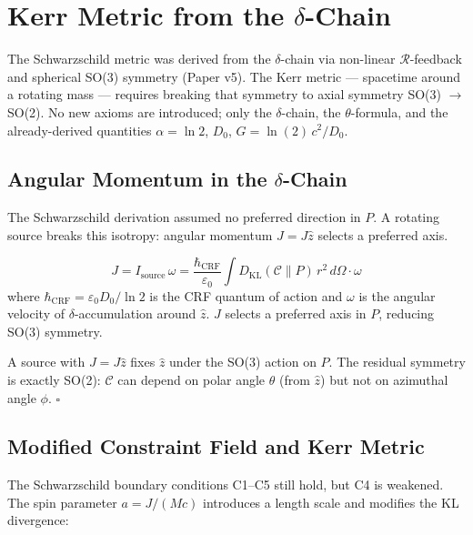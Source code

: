 \documentclass[12pt, a4paper]{article}
\begin{document}
\section{Kerr Metric from the $\delta$-Chain}

The Schwarzschild metric was derived from the $\delta$-chain via non-linear
$\mathcal{R}$-feedback and spherical SO(3) symmetry (Paper v5). The Kerr metric
--- spacetime around a rotating mass --- requires breaking that symmetry to axial
symmetry SO(3) $\to$ SO(2). No new axioms are introduced; only the $\delta$-chain,
the $\theta$-formula, and the already-derived quantities $\alpha = \ln 2$, $D_0$,
$G = \ln(2)\,c^2/D_0$.

\subsection{Angular Momentum in the $\delta$-Chain}

The Schwarzschild derivation assumed no preferred direction in $P$. A rotating source
breaks this isotropy: angular momentum $J = J\hat{z}$ selects a preferred axis.

\begin{formalbox}[title={Angular Momentum in CRF}]
\[
  J = I_{\mathrm{source}}\,\omega
  = \frac{\hbar_{\mathrm{CRF}}}{\varepsilon_0}\int D_{\mathrm{KL}}(\mathcal{C}\|P)\,r^2\,d\Omega\cdot\omega
\]
where $\hbar_{\mathrm{CRF}} = \varepsilon_0 D_0/\ln 2$ is the CRF quantum of action and
$\omega$ is the angular velocity of $\delta$-accumulation around $\hat{z}$.
$J$ selects a preferred axis in $P$, reducing SO(3) symmetry.
\end{formalbox}

\begin{derivedbox}[title={Lemma: Symmetry Reduction SO(3) $\to$ SO(2)}]
A source with $J = J\hat{z}$ fixes $\hat{z}$ under the SO(3) action on $P$.
The residual symmetry is exactly SO(2): $\mathcal{C}$ can depend on polar angle
$\theta$ (from $\hat{z}$) but not on azimuthal angle $\phi$. $\square$
\end{derivedbox}

\subsection{Modified Constraint Field and Kerr Metric}

The Schwarzschild boundary conditions C1--C5 still hold, but C4 is weakened. The spin
parameter $a = J/(Mc)$ introduces a length scale and modifies the KL divergence:
\end{document}
